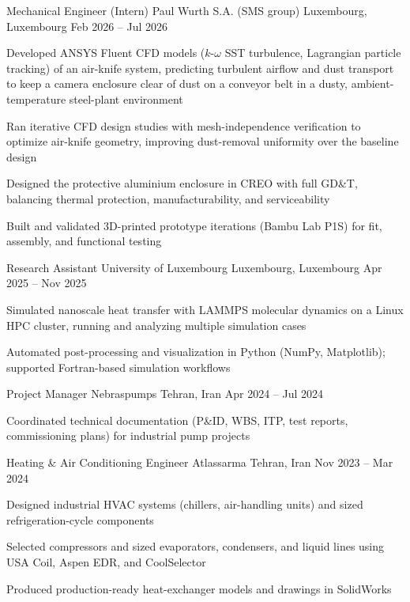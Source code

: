   \begin{cventries}

    \cventry
      {Mechanical Engineer (Intern)}
      {Paul Wurth S.A. (SMS group)}
      {Luxembourg, Luxembourg}
      {Feb 2026 -- Jul 2026}
      {
        \begin{cvitems}
          \item {Developed ANSYS Fluent CFD models ($k$-$\omega$ SST turbulence, Lagrangian particle tracking) of an air-knife system, predicting turbulent airflow and dust transport to keep a camera enclosure clear of dust on a conveyor belt in a dusty, ambient-temperature steel-plant environment}
          \item {Ran iterative CFD design studies with mesh-independence verification to optimize air-knife geometry, improving dust-removal uniformity over the baseline design}          
          \item {Designed the protective aluminium enclosure in CREO with full GD\&T, balancing thermal protection, manufacturability, and serviceability}
          \item {Built and validated 3D-printed prototype iterations (Bambu Lab P1S) for fit, assembly, and functional testing}
        \end{cvitems}
      }

    \cventry
      {Research Assistant}
      {University of Luxembourg}
      {Luxembourg, Luxembourg}
      {Apr 2025 -- Nov 2025}
      {
        \begin{cvitems}
          \item {Simulated nanoscale heat transfer with LAMMPS molecular dynamics on a Linux HPC cluster, running and analyzing multiple simulation cases}
          \item {Automated post-processing and visualization in Python (NumPy, Matplotlib); supported Fortran-based simulation workflows}
        \end{cvitems}
      }

      \cventry
        {Project Manager}
        {Nebraspumps}
        {Tehran, Iran}
        {Apr 2024 -- Jul 2024}
        {
          \begin{cvitems}
            \item {Coordinated technical documentation (P\&ID, WBS, ITP, test reports, commissioning plans) for industrial pump projects}
          \end{cvitems}
        }

    \cventry
      {Heating \& Air Conditioning Engineer}
      {Atlassarma}
      {Tehran, Iran}
      {Nov 2023 -- Mar 2024}
      {
        \begin{cvitems}
          \item {Designed industrial HVAC systems (chillers, air-handling units) and sized refrigeration-cycle components}
          \item {Selected compressors and sized evaporators, condensers, and liquid lines using USA Coil, Aspen EDR, and CoolSelector}
          \item {Produced production-ready heat-exchanger models and drawings in SolidWorks}
        \end{cvitems}
      }



\end{cventries}
